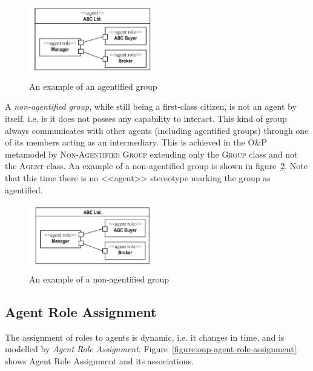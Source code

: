 \begin{figure}[ht]
	\centering
	\includegraphics[width=0.5\textwidth]{images/onp-agentified-group.png}
	\caption{An example of an agentified group}
	\label{figure:onp-agentified-group}
\end{figure}

A \textit{non-agentified group}, while still being a first-class citizen, is not an agent by itself, i.e. is it does not posses any capability to interact.
This kind of group always communicates with other agents (including agentified groups) through one of its members acting as an intermediary.
This is achieved in the O\&P metamodel by \textsc{Non-Agentified Group} extending only the \textsc{Group} class and not the \textsc{Agent} class.
An example of a non-agentified group is shown in figure~\ref{figure:onp-non-agentified-group}.
Note that this time there is no <<agent>> stereotype marking the group as agentified.

\begin{figure}[ht]
	\centering
	\includegraphics[width=0.5\textwidth]{images/onp-non-agentified-group.png}
	\caption{An example of a non-agentified group}
	\label{figure:onp-non-agentified-group}
\end{figure}

\subsection{Agent Role Assignment}

The assignment of roles to agents is dynamic, i.e. it changes in time, and is modelled by \textit{Agent Role Assignment}.
Figure~\ref{figure:onp-agent-role-assignment} shows Agent Role Assignment and its associations.  

